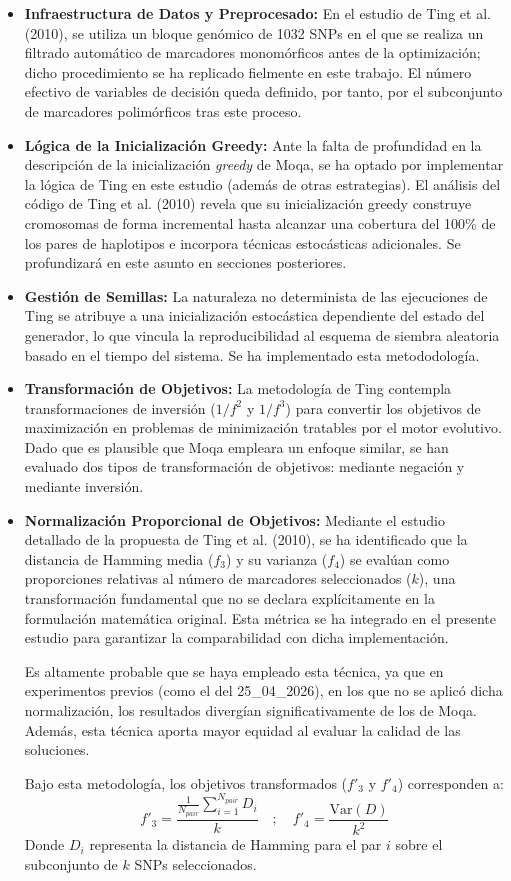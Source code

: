 \documentclass[a4paper,10pt]{article}
\begin{document}
\begin{itemize}
    \item \textbf{Infraestructura de Datos y Preprocesado:} En el estudio de Ting et al. (2010), se utiliza un bloque genómico de 1032 SNPs en el que se realiza un filtrado automático de marcadores monomórficos antes de la optimización; dicho procedimiento se ha replicado fielmente en este trabajo. El número efectivo de variables de decisión queda definido, por tanto, por el subconjunto de marcadores polimórficos tras este proceso.
    \item \textbf{Lógica de la Inicialización Greedy:} Ante la falta de profundidad en la descripción de la inicialización \textit{greedy} de Moqa, se ha optado por implementar la lógica de Ting en este estudio (además de otras estrategias). El análisis del código de Ting et al. (2010) revela que su inicialización greedy construye cromosomas de forma incremental hasta alcanzar una cobertura del 100\% de los pares de haplotipos e incorpora técnicas estocásticas adicionales. Se profundizará en este asunto en secciones posteriores.
    \item \textbf{Gestión de Semillas:} La naturaleza no determinista de las ejecuciones de Ting se atribuye a una inicialización estocástica dependiente del estado del generador, lo que vincula la reproducibilidad al esquema de siembra aleatoria basado en el tiempo del sistema. Se ha implementado esta metododología.
    \item \textbf{Transformación de Objetivos:} La metodología de Ting contempla transformaciones de inversión ($1/f^2$ y $1/f^3$) para convertir los objetivos de maximización en problemas de minimización tratables por el motor evolutivo. Dado que es plausible que Moqa empleara un enfoque similar, se han evaluado dos tipos de transformación de objetivos: mediante negación y mediante inversión.
    \item \textbf{Normalización Proporcional de Objetivos:} Mediante el estudio detallado de la propuesta de Ting et al. (2010), se ha identificado que la distancia de Hamming media ($f_3$) y su varianza ($f_4$) se evalúan como proporciones relativas al número de marcadores seleccionados ($k$), una transformación fundamental que no se declara explícitamente en la formulación matemática original. Esta métrica se ha integrado en el presente estudio para garantizar la comparabilidad con dicha implementación. 
    
    Es altamente probable que se haya empleado esta técnica, ya que en experimentos previos (como el del 25\_04\_2026), en los que no se aplicó dicha normalización, los resultados divergían significativamente de los de Moqa. Además, esta técnica aporta mayor equidad al evaluar la calidad de las soluciones.
    
    Bajo esta metodología, los objetivos transformados ($f'_3$ y $f'_4$) corresponden a:
    \begin{equation}
        f'_3 = \frac{\frac{1}{N_{pair}} \sum_{i=1}^{N_{pair}} D_i}{k} \quad ; \quad f'_4 = \frac{\text{Var}(D)}{k^2}
    \end{equation}
    Donde $D_i$ representa la distancia de Hamming para el par $i$ sobre el subconjunto de $k$ SNPs seleccionados.
\end{itemize}
\end{document}
